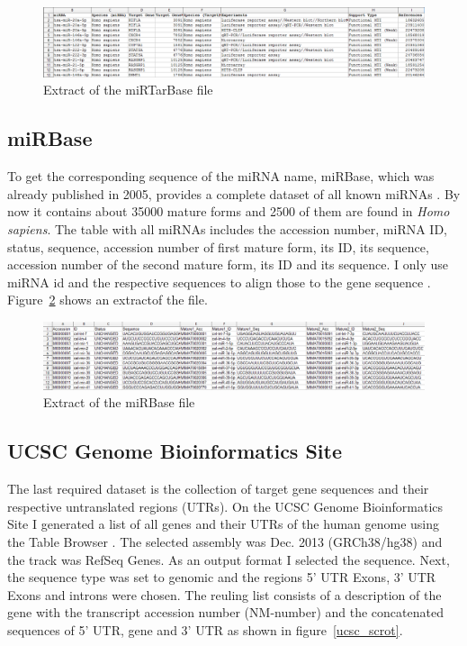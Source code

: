 \documentclass[11pt,  a4paper]{report}
\begin{document}
\begin{figure}[h]
\centering
\includegraphics[width=\textwidth]{results/mirtarbase_scrot.png}
\caption{Extract of the miRTarBase file}
\label{mirtarbase_scrot}
\end{figure}
\vspace{0.5cm}


\subsection{miRBase}
To get the corresponding sequence of the miRNA name, miRBase, which was already published in 2005, provides a complete dataset of all known miRNAs \cite{Griffiths-Jones}. By now it contains about 35000 mature forms and 2500 of them are found in \textit{Homo sapiens}. The table with all miRNAs includes the accession number, miRNA ID, status, sequence, accession number of first mature form, its ID, its sequence, accession number of the second mature form, its ID and its sequence. I only use miRNA id and the respective sequences to align those to the gene sequence \cite{mirbase}. Figure~\ref{mirbase_scrot} shows an extractof the file.\\


\begin{figure}[h]
\centering
\includegraphics[width=\textwidth]{results/mirbase.png}
\caption{Extract of the miRBase file}
\label{mirbase_scrot}
\end{figure}


\vspace{0.5cm}

 
\subsection{UCSC Genome Bioinformatics Site}
The last required dataset is the collection of target gene sequences and their respective untranslated regions (UTRs). On the UCSC Genome Bioinformatics Site I generated a list of all genes and their UTRs of the human genome using the Table Browser \cite{ucsc}. The selected assembly was Dec. 2013 (GRCh38/hg38) and the track was RefSeq Genes. As an output format I selected the sequence. Next, the sequence type was set to genomic and the regions 5' UTR Exons, 3' UTR Exons and introns were chosen. The reuling list consists of a description of the gene with the transcript accession number (NM-number) and the concatenated sequences of 5' UTR, gene and 3' UTR as shown in figure~\ref{ucsc_scrot}.\\
\end{document}
